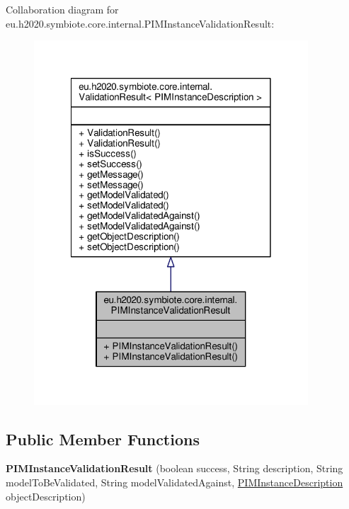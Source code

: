 Collaboration diagram for eu.\+h2020.\+symbiote.\+core.\+internal.\+P\+I\+M\+Instance\+Validation\+Result\+:\nopagebreak
\begin{figure}[H]
\begin{center}
\leavevmode
\includegraphics[width=290pt]{classeu_1_1h2020_1_1symbiote_1_1core_1_1internal_1_1PIMInstanceValidationResult__coll__graph}
\end{center}
\end{figure}
\subsection*{Public Member Functions}
\begin{DoxyCompactItemize}
\item 
\mbox{\label{classeu_1_1h2020_1_1symbiote_1_1core_1_1internal_1_1PIMInstanceValidationResult_ae79dd445e2db88f36f014125514c1570}} 
{\bfseries P\+I\+M\+Instance\+Validation\+Result} (boolean success, String description, String model\+To\+Be\+Validated, String model\+Validated\+Against, \hyperlink{classeu_1_1h2020_1_1symbiote_1_1core_1_1internal_1_1PIMInstanceDescription}{P\+I\+M\+Instance\+Description} object\+Description)
\end{DoxyCompactItemize}


